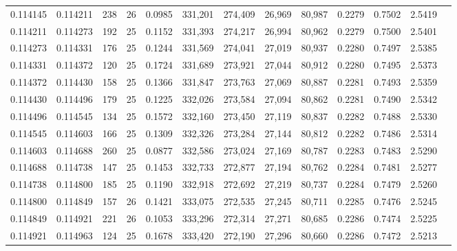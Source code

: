 \begin{tabular}{rrrrrrrrrrrrr}
0.114145 & 0.114211 &   238 &  26 &                                     0.0985 & 331,201 & 274,409 &  26,969 &  80,987 & 0.2279 & 0.7502 & 2.5419 \\
0.114211 & 0.114273 &   192 &  25 &                                     0.1152 & 331,393 & 274,217 &  26,994 &  80,962 & 0.2279 & 0.7500 & 2.5401 \\
0.114273 & 0.114331 &   176 &  25 &                                     0.1244 & 331,569 & 274,041 &  27,019 &  80,937 & 0.2280 & 0.7497 & 2.5385 \\
0.114331 & 0.114372 &   120 &  25 &                                     0.1724 & 331,689 & 273,921 &  27,044 &  80,912 & 0.2280 & 0.7495 & 2.5373 \\
0.114372 & 0.114430 &   158 &  25 &                                     0.1366 & 331,847 & 273,763 &  27,069 &  80,887 & 0.2281 & 0.7493 & 2.5359 \\
0.114430 & 0.114496 &   179 &  25 &                                     0.1225 & 332,026 & 273,584 &  27,094 &  80,862 & 0.2281 & 0.7490 & 2.5342 \\
0.114496 & 0.114545 &   134 &  25 &                                     0.1572 & 332,160 & 273,450 &  27,119 &  80,837 & 0.2282 & 0.7488 & 2.5330 \\
0.114545 & 0.114603 &   166 &  25 &                                     0.1309 & 332,326 & 273,284 &  27,144 &  80,812 & 0.2282 & 0.7486 & 2.5314 \\
0.114603 & 0.114688 &   260 &  25 &                                     0.0877 & 332,586 & 273,024 &  27,169 &  80,787 & 0.2283 & 0.7483 & 2.5290 \\
0.114688 & 0.114738 &   147 &  25 &                                     0.1453 & 332,733 & 272,877 &  27,194 &  80,762 & 0.2284 & 0.7481 & 2.5277 \\
0.114738 & 0.114800 &   185 &  25 &                                     0.1190 & 332,918 & 272,692 &  27,219 &  80,737 & 0.2284 & 0.7479 & 2.5260 \\
0.114800 & 0.114849 &   157 &  26 &                                     0.1421 & 333,075 & 272,535 &  27,245 &  80,711 & 0.2285 & 0.7476 & 2.5245 \\
0.114849 & 0.114921 &   221 &  26 &                                     0.1053 & 333,296 & 272,314 &  27,271 &  80,685 & 0.2286 & 0.7474 & 2.5225 \\
0.114921 & 0.114963 &   124 &  25 &                                     0.1678 & 333,420 & 272,190 &  27,296 &  80,660 & 0.2286 & 0.7472 & 2.5213 \\

\end{tabular}

